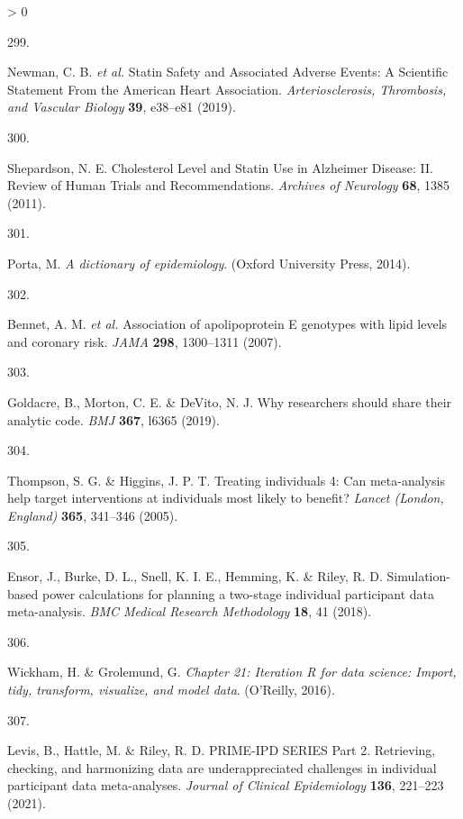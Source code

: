 \documentclass[a4paper, twoside]{templates/ociamthesis}
\newlength{\cslhangindent}
\newlength{\csllabelwidth}
\newenvironment{CSLReferences}[3] %
 {%
  \setlength{\parindent}{0pt}
  \ifodd #1 \everypar{\setlength{\hangindent}{\cslhangindent}}\ignorespaces\fi
  \ifnum #2 > 0
  \setlength{\parskip}{#2\baselineskip}
  \fi
 }%
 {}
\newcommand{\CSLLeftMargin}[1]{\parbox[t]{\maxof{\widthof{#1}}{\csllabelwidth}}{#1}}
\newcommand{\CSLRightInline}[1]{\parbox[t]{\linewidth - \csllabelwidth}{#1}}
\begin{document}
\begin{CSLReferences}{0}{0}
\leavevmode\hypertarget{ref-newman2019}{}%
\CSLLeftMargin{299. }
\CSLRightInline{Newman, C. B. \emph{et al.} Statin {Safety} and {Associated Adverse Events}: A {Scientific Statement From} the {American Heart Association}. \emph{Arteriosclerosis, Thrombosis, and Vascular Biology} \textbf{39}, e38--e81 (2019).}

\leavevmode\hypertarget{ref-shepardson2011}{}%
\CSLLeftMargin{300. }
\CSLRightInline{Shepardson, N. E. Cholesterol {Level} and {Statin Use} in {Alzheimer Disease}: {II}. {Review} of {Human Trials} and {Recommendations}. \emph{Archives of Neurology} \textbf{68}, 1385 (2011).}

\leavevmode\hypertarget{ref-porta2014dictionary}{}%
\CSLLeftMargin{301. }
\CSLRightInline{Porta, M. \emph{A dictionary of epidemiology}. ({Oxford University Press}, 2014).}

\leavevmode\hypertarget{ref-bennet2007}{}%
\CSLLeftMargin{302. }
\CSLRightInline{Bennet, A. M. \emph{et al.} Association of apolipoprotein {E} genotypes with lipid levels and coronary risk. \emph{JAMA} \textbf{298}, 1300--1311 (2007).}

\leavevmode\hypertarget{ref-goldacre2019c}{}%
\CSLLeftMargin{303. }
\CSLRightInline{Goldacre, B., Morton, C. E. \& DeVito, N. J. Why researchers should share their analytic code. \emph{BMJ} \textbf{367}, l6365 (2019).}

\leavevmode\hypertarget{ref-thompson2005}{}%
\CSLLeftMargin{304. }
\CSLRightInline{Thompson, S. G. \& Higgins, J. P. T. Treating individuals 4: Can meta-analysis help target interventions at individuals most likely to benefit? \emph{Lancet (London, England)} \textbf{365}, 341--346 (2005).}

\leavevmode\hypertarget{ref-ensor2018}{}%
\CSLLeftMargin{305. }
\CSLRightInline{Ensor, J., Burke, D. L., Snell, K. I. E., Hemming, K. \& Riley, R. D. Simulation-based power calculations for planning a two-stage individual participant data meta-analysis. \emph{BMC Medical Research Methodology} \textbf{18}, 41 (2018).}

\leavevmode\hypertarget{ref-wickham2016a}{}%
\CSLLeftMargin{306. }
\CSLRightInline{Wickham, H. \& Grolemund, G. \emph{Chapter 21: Iteration \textbar{} {R} for data science: Import, tidy, transform, visualize, and model data}. ({O'Reilly}, 2016).}

\leavevmode\hypertarget{ref-levis2021}{}%
\CSLLeftMargin{307. }
\CSLRightInline{Levis, B., Hattle, M. \& Riley, R. D. {PRIME}-{IPD SERIES Part} 2. {Retrieving}, checking, and harmonizing data are underappreciated challenges in individual participant data meta-analyses. \emph{Journal of Clinical Epidemiology} \textbf{136}, 221--223 (2021).}


\end{CSLReferences}
\end{document}

